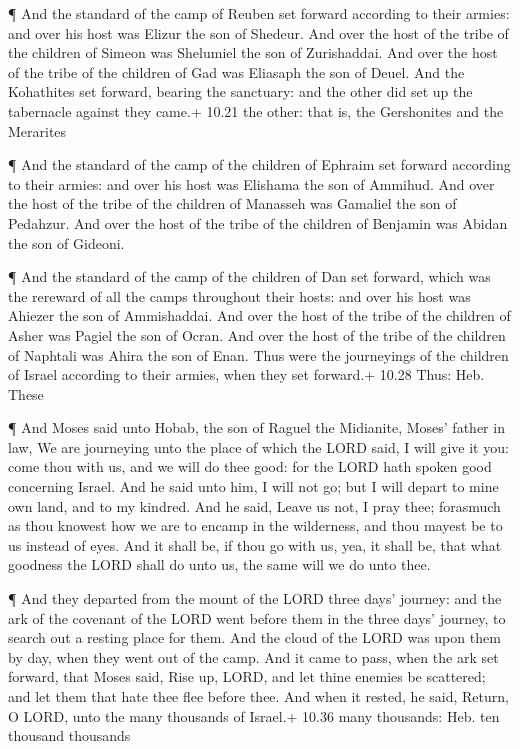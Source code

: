 ¶ And the standard of the camp of Reuben set forward
according to their armies: and over his host was Elizur the son of
Shedeur.  And over the host of the tribe of the children of
Simeon was Shelumiel the son of Zurishaddai.  And over the
host of the tribe of the children of Gad was Eliasaph the son of Deuel.
 And the Kohathites set forward, bearing the sanctuary: and
the other did set up the tabernacle against they came.+ 10.21 the other:
that is, the Gershonites and the Merarites

 ¶ And the standard of the camp of the children of Ephraim
set forward according to their armies: and over his host was Elishama
the son of Ammihud.  And over the host of the tribe of the
children of Manasseh was Gamaliel the son of Pedahzur.  And
over the host of the tribe of the children of Benjamin was Abidan the
son of Gideoni.

 ¶ And the standard of the camp of the children of Dan set
forward, which was the rereward of all the camps throughout their hosts:
and over his host was Ahiezer the son of Ammishaddai.  And
over the host of the tribe of the children of Asher was Pagiel the son
of Ocran.  And over the host of the tribe of the children
of Naphtali was Ahira the son of Enan.  Thus were the
journeyings of the children of Israel according to their armies, when
they set forward.+ 10.28 Thus: Heb. These

 ¶ And Moses said unto Hobab, the son of Raguel the
Midianite, Moses' father in law, We are journeying unto the place of
which the LORD said, I will give it you: come thou with us, and we will
do thee good: for the LORD hath spoken good concerning Israel.
 And he said unto him, I will not go; but I will depart to
mine own land, and to my kindred.  And he said, Leave us
not, I pray thee; forasmuch as thou knowest how we are to encamp in the
wilderness, and thou mayest be to us instead of eyes.  And
it shall be, if thou go with us, yea, it shall be, that what goodness
the LORD shall do unto us, the same will we do unto thee.

 ¶ And they departed from the mount of the LORD three days'
journey: and the ark of the covenant of the LORD went before them in the
three days' journey, to search out a resting place for them.
 And the cloud of the LORD was upon them by day, when they
went out of the camp.  And it came to pass, when the ark
set forward, that Moses said, Rise up, LORD, and let thine enemies be
scattered; and let them that hate thee flee before thee. 
And when it rested, he said, Return, O LORD, unto the many thousands of
Israel.+ 10.36 many thousands: Heb. ten thousand thousands

